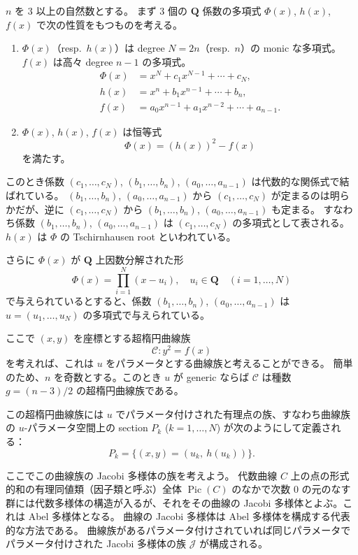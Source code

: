 \documentclass[uplatex,dvipdfmx]{jlreq}
\def\Pic{\operatorname{Pic}}
\begin{document}
$n$ を $3$ 以上の自然数とする。
まず $3$ 個の $\mathbf{Q}$ 係数の多項式 $\Phi(x)$, $h(x)$, $f(x)$ で次の性質をもつものを考える。
\begin{enumerate}
  \item $\Phi(x)$（resp.\ $h(x)$）は degree $N = 2n$（resp.\ $n$）の monic な多項式。$f(x)$ は高々 degree $n-1$ の多項式。
        \begin{align*}
          \Phi(x) & = x^{N} + c_1 x^{N-1} + \cdots + c_N, \\
          h(x)    & = x^n + b_1 x^{n-1} + \cdots + b_n,   \\
          f(x)    & = a_0 x^{n-1} + a_1 x^{n-2} + \cdots + a_{n-1}.
        \end{align*}
  \item $\Phi(x)$, $h(x)$, $f(x)$ は恒等式
        \[
          \Phi(x) = (h(x))^2 - f(x)
        \]
        を満たす。
\end{enumerate}

このとき係数 $(c_1, \dots, c_N)$, $(b_1, \dots, b_n)$, $(a_0, \dots, a_{n-1})$ は代数的な関係式で結ばれている。
$(b_1, \dots, b_n)$, $(a_0, \dots, a_{n-1})$ から $(c_1, \dots, c_N)$ が定まるのは明らかだが、逆に $(c_1, \dots, c_N)$ から $(b_1, \dots, b_n)$, $(a_0, \dots, a_{n-1})$ も定まる。
すなわち係数 $(b_1, \dots, b_n)$, $(a_0, \dots, a_{n-1})$ は $(c_1, \dots, c_N)$ の多項式として表される。
$h(x)$ は $\Phi$ の Tschirnhausen root といわれている。

さらに $\Phi(x)$ が $\mathbf{Q}$ 上因数分解された形
\[
  \Phi(x) = \prod_{i=1}^{N}(x - u_i), \quad u_i \in \mathbf{Q} \quad (i = 1, \dots, N)
\]
で与えられているとすると、係数 $(b_1, \dots, b_n)$, $(a_0, \dots, a_{n-1})$ は $u = (u_1, \dots, u_N)$ の多項式で与えられている。

ここで $(x, y)$ を座標とする超楕円曲線族
\[
  \mathcal{C} : y^2 = f(x)
\]
を考えれば、これは $u$ をパラメータとする曲線族と考えることができる。
簡単のため、$n$ を奇数とする。このとき $u$ が generic ならば $\mathcal{C}$ は種数 $g = (n-3)/2$ の超楕円曲線族である。

この超楕円曲線族には $u$ でパラメータ付けされた有理点の族、すなわち曲線族の $u$-パラメータ空間上の section $P_k$ ($k = 1, \dots, N$) が次のようにして定義される：
\[
  P_k = \{(x, y) = (u_k,\ h(u_k))\}.
\]

ここでこの曲線族の Jacobi 多様体の族を考えよう。
代数曲線 $C$ 上の点の形式的和の有理同値類（因子類と呼ぶ）全体 $\Pic(C)$ のなかで次数 $0$ の元のなす群には代数多様体の構造が入るが、それをその曲線の Jacobi 多様体とよぶ。これは Abel 多様体となる。
曲線の Jacobi 多様体は Abel 多様体を構成する代表的な方法である。
曲線族があるパラメータ付けされていれば同じパラメータでパラメータ付けされた Jacobi 多様体の族 $\mathcal{J}$ が構成される。
\end{document}
